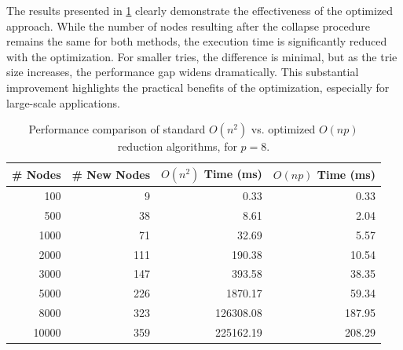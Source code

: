 The results presented in \cref{tab:reduction_comparison} clearly demonstrate the effectiveness of the optimized approach. While the number of nodes resulting after the collapse procedure remains the same for both methods, the execution time is significantly reduced with the optimization. For smaller tries, the difference is minimal, but as the trie size increases, the performance gap widens dramatically. This substantial improvement highlights the practical benefits of the optimization, especially for large-scale applications.

\begin{table}[H]
    \centering
    \begin{tabular}{|r|r||r|r|}
        \hline
        \textbf{\# Nodes} & \textbf{\# New Nodes} & \textbf{$O(n^2)$ Time (ms)} & \textbf{$O(np)$ Time (ms)} \\
        \hline
        100 & 9 & 0.33 & 0.33 \\
        \hline
        500 & 38 & 8.61 & 2.04 \\
        \hline
        1000 & 71 & 32.69 & 5.57 \\
        \hline
        2000 & 111 & 190.38 & 10.54 \\
        \hline
        3000 & 147 & 393.58 & 38.35 \\
        \hline
        5000 & 226 & 1870.17 & 59.34 \\
        \hline
        8000 & 323 & 126308.08 & 187.95 \\
        \hline
        10000 & 359 & 225162.19 & 208.29 \\
        \hline
    \end{tabular}
    
    \caption{Performance comparison of standard $O(n^2)$ vs. optimized $O(np)$ reduction algorithms, for $p = 8$.}
    \label{tab:reduction_comparison}
\end{table}

